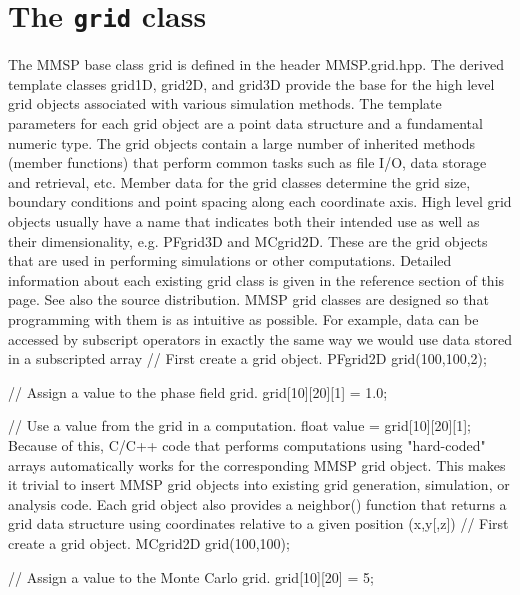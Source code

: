 
\chapter{The {\tt grid} class}

The MMSP base class grid is defined in the header MMSP.grid.hpp. The derived template classes grid1D, grid2D, and grid3D provide the base for the high level grid objects associated with various simulation methods. The template parameters for each grid object are a point data structure and a fundamental numeric type. The grid objects contain a large number of inherited methods (member functions) that perform common tasks such as file I/O, data storage and retrieval, etc. Member data for the grid classes determine the grid size, boundary conditions and point spacing along each coordinate axis. 
High level grid objects usually have a name that indicates both their intended use as well as their dimensionality, e.g. PFgrid3D and MCgrid2D. These are the grid objects that are used in performing simulations or other computations. Detailed information about each existing grid class is given in the reference section of this page. See also the source distribution. 
MMSP grid classes are designed so that programming with them is as intuitive as possible. For example, data can be accessed by subscript operators in exactly the same way we would use data stored in a subscripted array 
    // First create a grid object.
    PFgrid2D grid(100,100,2);

    // Assign a value to the phase field grid.
    grid[10][20][1] = 1.0;

    // Use a value from the grid in a computation.
    float value = grid[10][20][1];
Because of this, C/C++ code that performs computations using "hard-coded" arrays automatically works for the corresponding MMSP grid object. This makes it trivial to insert MMSP grid objects into existing grid generation, simulation, or analysis code. 
Each grid object also provides a neighbor() function that returns a grid data structure using coordinates relative to a given position (x,y[,z]) 
    // First create a grid object.
    MCgrid2D grid(100,100);

    // Assign a value to the Monte Carlo grid.
    grid[10][20] = 5;


